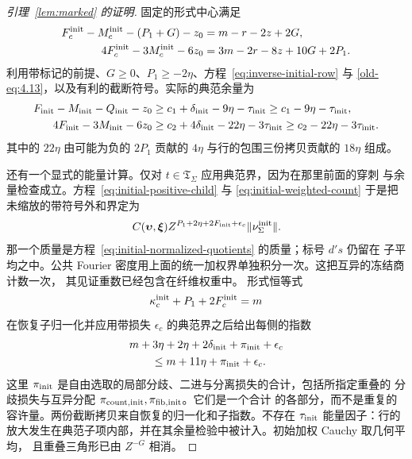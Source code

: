 \documentclass[11pt,a4paper]{article}
\numberwithin{equation}{section}
\numberwithin{figure}{section}
\theoremstyle{definition}
\theoremstyle{remark}
\begin{document}
\begin{proof}[引理~\ref{lem:marked} 的证明]
固定的形式中心满足
\[
 \begin{aligned}
 F_c^{\rm init}-M_c^{\rm init}-(P_1+G)-z_0&=m-r-2z+2G,\\
 4F_c^{\rm init}-3M_c^{\rm init}-6z_0&=3m-2r-8z+10G+2P_1.
 \end{aligned}
\]
利用带标记的前提、\(G\ge0\)、\(P_1\ge-2\eta\)、方程~\eqref{eq:inverse-initial-row} 与
\eqref{old-eq:4.13}，以及有利的截断符号。实际的典范余量为
\begin{equation}\label{eq:inverse-initial-margins}
 \begin{aligned}
 F_{\rm init}-M_{\rm init}-Q_{\rm init}-z_0
   &\ge c_1+\delta_{\rm init}-9\eta-\tau_{\rm init}
     \ge c_1-9\eta-\tau_{\rm init},\\
 4F_{\rm init}-3M_{\rm init}-6z_0
   &\ge c_2+4\delta_{\rm init}-22\eta-3\tau_{\rm init}
     \ge c_2-22\eta-3\tau_{\rm init}.
 \end{aligned}
\end{equation}
其中的 \(22\eta\) 由可能为负的 \(2P_1\) 贡献的 \(4\eta\) 与行的包围三份拷贝贡献的
\(18\eta\) 组成。

还有一个显式的能量计算。仅对 \(t\in\mathfrak T_\Sigma\) 应用典范界，因为在那里前面的穿刺
与余量检查成立。方程~\eqref{eq:initial-positive-child} 与 \eqref{eq:initial-weighted-count}
于是把未缩放的带符号外和界定为
\[
 C(\boldsymbol\upsilon,\boldsymbol\xi)
 Z^{P_1+2\eta+2F_{\rm init}+\epsilon_c}
 \|\nu_\Sigma^{\rm init}\|.
\]
那一个质量是方程~\eqref{eq:initial-normalized-quotients} 的质量；标号 \(d's\) 仍留在
子平均之中。公共 Fourier 密度用上面的统一加权界单独积分一次。这把互异的冻结商计数一次，
其见证重数已经包含在纤维权重中。
形式恒等式
\[
 \kappa_c^{\rm init}+P_1+2F_c^{\rm init}=m
\]
在恢复子归一化并应用带损失 \(\epsilon_c\) 的典范界之后给出每侧的指数
\begin{equation}\label{eq:inverse-initial-energy}
 \begin{split}
 &m+3\eta+2\eta+2\delta_{\rm init}+\pi_{\rm init}+\epsilon_c\\
 &\qquad\le m+11\eta+\pi_{\rm init}+\epsilon_c.
 \end{split}
\end{equation}
这里 \(\pi_{\rm init}\) 是自由选取的局部分歧、二进与分离损失的合计，包括所指定重叠的
分歧损失与互异分配 \(\pi_{{\rm count},{\rm init}},\pi_{{\rm fib},{\rm init}}\)。它们是一个合计
的各部分，而不是重复的容许量。两份截断拷贝来自恢复的归一化和子指数。不存在 \(\tau_{\rm init}\)
能量因子：行的放大发生在典范子项内部，并在其余量检验中被计入。初始加权 Cauchy 取几何平均，
且重叠三角形已由 \(Z^{-G}\) 相消。


\end{proof}
\end{document}
